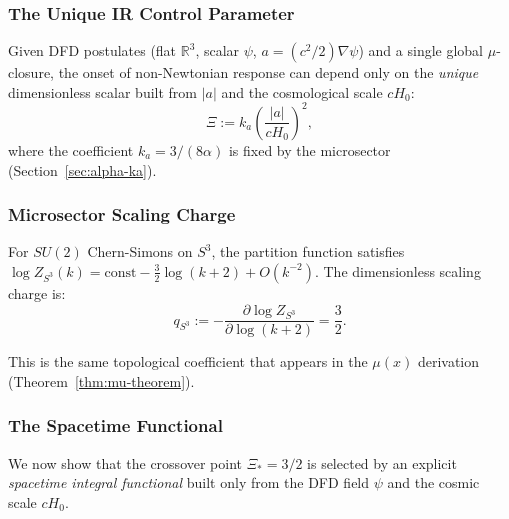 \subsubsection{The Unique IR Control Parameter}

Given DFD postulates (flat $\mathbb{R}^3$, scalar $\psi$, $a = (c^2/2)\nabla\psi$) and a single global $\mu$-closure, the onset of non-Newtonian response can depend only on the \textit{unique} dimensionless scalar built from $|a|$ and the cosmological scale $cH_0$:
\begin{equation}
\Xi := k_a \left(\frac{|a|}{cH_0}\right)^2,
\label{eq:Xi-def-var}
\end{equation}
where the coefficient $k_a = 3/(8\alpha)$ is fixed by the microsector (Section~\ref{sec:alpha-ka}).

\subsubsection{Microsector Scaling Charge}

\begin{lemma}\label{lem:scaling-charge}
For $SU(2)$ Chern-Simons on $S^3$, the partition function satisfies $\log Z_{S^3}(k) = \mathrm{const} - \frac{3}{2}\log(k+2) + O(k^{-2})$. The dimensionless scaling charge is:
\begin{equation}
q_{S^3} := -\frac{\partial \log Z_{S^3}}{\partial \log(k+2)} = \frac{3}{2}.
\label{eq:scaling-charge-def}
\end{equation}
\end{lemma}

This is the same topological coefficient that appears in the $\mu(x)$ derivation (Theorem~\ref{thm:mu-theorem}).

\subsubsection{The Spacetime Functional}

We now show that the crossover point $\Xi_* = 3/2$ is selected by an explicit \textit{spacetime integral functional} built only from the DFD field $\psi$ and the cosmic scale $cH_0$.

